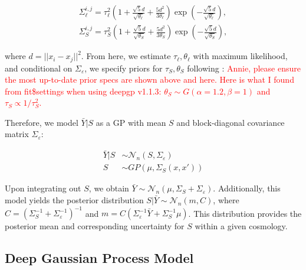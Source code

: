 \documentclass[11pt]{article}
\begin{document}
\begin{align}
\Sigma_\ell^{i,j} = \tau_\ell^2  \left( 1 + \frac{\sqrt{5}d}{\sqrt{\theta_\ell}} + 
  \frac{5d^2}{3\theta_\ell}\right) \exp\left(-\frac{\sqrt{5}d}{\sqrt{\theta_\ell}}\right),\\
\Sigma_S^{i,j} = \tau_S^2  \left( 1 + \frac{\sqrt{5}d}{\sqrt{\theta_S}} + 
  \frac{5d^2}{3\theta_S}\right) \exp\left(-\frac{\sqrt{5}d}{\sqrt{\theta_S}}\right),
\end{align}

where $d=||x_i-x_j||^2$. From here, we estimate $\tau_\ell, \theta_\ell$ with maximum 
likelihood, and conditional on $\Sigma_\varepsilon$, we specify priors for $\tau_S, \theta_S$ 
following \cite{sauer2023active}: \textcolor{red}{Annie, please ensure the most up-to-date 
prior specs are shown above and here. Here is what I found from fit\$settings when using 
deepgp v1.1.3: $\theta_S \sim G(\alpha=1.2, \beta=1)$ and $\tau_S \propto 1/\tau_S^2$.}


Therefore, we model $\bar Y|S$ as a GP with mean $S$ and block-diagonal covariance 
matrix $\Sigma_\varepsilon$:

\begin{align}
\bar Y|S &\sim \mathcal{N}_n(S,\Sigma_\varepsilon) \\
S &\sim GP\left(\mu, \Sigma_S(x,x')\right)
\end{align}

Upon integrating out $S$, we obtain $\bar Y \sim \mathcal{N}_n(\mu, \Sigma_S+\Sigma_\varepsilon)$. 
Additionally, this model yields the posterior distribution $S|\bar Y \sim \mathcal{N}_n(m, C)$, 
where $C=\left(\Sigma_S^{-1}+\Sigma_\varepsilon^{-1}\right)^{-1}$ and 
$m=C\left(\Sigma_\varepsilon^{-1}\bar Y+\Sigma_S^{-1}\mu\right)$. 
This distribution provides the posterior mean and corresponding uncertainty for 
$S$ within a given cosmology. 

\subsection{Deep Gaussian Process Model}
\end{document}
